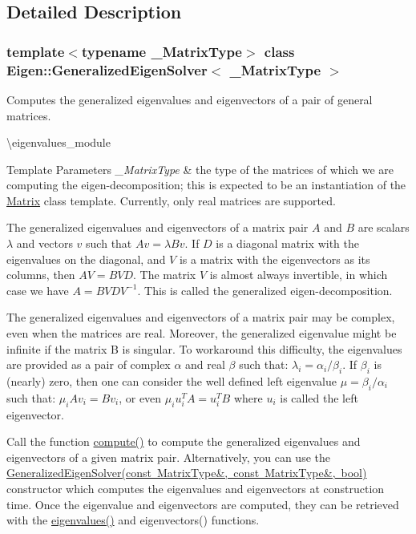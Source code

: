 \subsection{Detailed Description}
\subsubsection*{template$<$typename \+\_\+\+Matrix\+Type$>$\newline
class Eigen\+::\+Generalized\+Eigen\+Solver$<$ \+\_\+\+Matrix\+Type $>$}

Computes the generalized eigenvalues and eigenvectors of a pair of general matrices. 

\textbackslash{}eigenvalues\+\_\+module


\begin{DoxyTemplParams}{Template Parameters}
{\em \+\_\+\+Matrix\+Type} & the type of the matrices of which we are computing the eigen-\/decomposition; this is expected to be an instantiation of the \mbox{\hyperlink{class_eigen_1_1_matrix}{Matrix}} class template. Currently, only real matrices are supported.\\
\hline
\end{DoxyTemplParams}
The generalized eigenvalues and eigenvectors of a matrix pair $ A $ and $ B $ are scalars $ \lambda $ and vectors $ v $ such that $ Av = \lambda Bv $. If $ D $ is a diagonal matrix with the eigenvalues on the diagonal, and $ V $ is a matrix with the eigenvectors as its columns, then $ A V = B V D $. The matrix $ V $ is almost always invertible, in which case we have $ A = B V D V^{-1} $. This is called the generalized eigen-\/decomposition.

The generalized eigenvalues and eigenvectors of a matrix pair may be complex, even when the matrices are real. Moreover, the generalized eigenvalue might be infinite if the matrix B is singular. To workaround this difficulty, the eigenvalues are provided as a pair of complex $ \alpha $ and real $ \beta $ such that\+: $ \lambda_i = \alpha_i / \beta_i $. If $ \beta_i $ is (nearly) zero, then one can consider the well defined left eigenvalue $ \mu = \beta_i / \alpha_i$ such that\+: $ \mu_i A v_i = B v_i $, or even $ \mu_i u_i^T A = u_i^T B $ where $ u_i $ is called the left eigenvector.

Call the function \mbox{\hyperlink{class_eigen_1_1_generalized_eigen_solver_a275910b47dfe5f40211dcb59cfd68f3c}{compute()}} to compute the generalized eigenvalues and eigenvectors of a given matrix pair. Alternatively, you can use the \mbox{\hyperlink{class_eigen_1_1_generalized_eigen_solver_a2a3528cbf75f66d3a60af9dc7b12ff65}{Generalized\+Eigen\+Solver(const Matrix\+Type\&, const Matrix\+Type\&, bool)}} constructor which computes the eigenvalues and eigenvectors at construction time. Once the eigenvalue and eigenvectors are computed, they can be retrieved with the \mbox{\hyperlink{class_eigen_1_1_generalized_eigen_solver_a62f01cd78271efd5e39bcb24e0fe1a58}{eigenvalues()}} and eigenvectors() functions.

